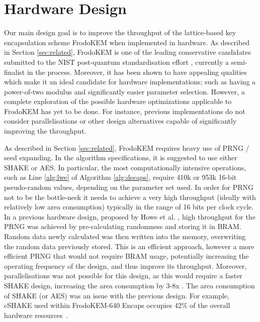 \section{Hardware Design} \label{sec:design}

Our main design goal is to improve the throughput of the lattice-based key encapsulation scheme FrodoKEM \cite{frodokem} when implemented in hardware. As described in Section \ref{sec:related}, FrodoKEM is one of the leading conservative candidates submitted to the NIST post-quantum standardisation effort \cite{nistpq}, currently a semi-finalist in the process. Moreover, it has been shown to have appealing qualities which make it an ideal candidate for hardware implementations; such as having a power-of-two modulus and significantly easier parameter selection. However, a complete exploration of the possible hardware optimizations applicable to FrodoKEM has yet to be done. For instance, previous implementations do not consider parallelisations or other design alternatives capable of significantly improving the throughput.

As described in Section \ref{sec:related}, FrodoKEM requires heavy use of PRNG / seed expanding. In the algorithm specifications, it is suggested to use either SHAKE or AES. In particular, the most computationally intensive operations, such as Line \ref{alg:lwe} of Algorithm \ref{alg:decaps}, require 410k or 953k 16-bit pseudo-random values, depending on the parameter set used. In order for PRNG not to be the bottle-neck it needs to achieve a very high throughput (ideally with relatively low area consumption) typically in the range of 16 bits per clock cycle. In a previous hardware design, proposed by Howe et al. \cite{howe2018standard}, high throughput for the PRNG was achieved by pre-calculating randomness and storing it in BRAM. Random data newly calculated was then written into the memory, overwriting the random data previously stored. This is an efficient approach, however a more efficient PRNG that would not require BRAM usage, potentially increasing the operating frequency of the design, and thus improve its throughput. Moreover, parallelisations was not possible for this design, as this would require a faster SHAKE design, increasing the area consumption by 3-8x \cite{bertoni2012keccak}. The area consumption of SHAKE (or AES) was an issue with the previous design. For example, cSHAKE used within FrodoKEM-640 Encaps occupies 42\% of the overall hardware resources~\cite{howe2018standard}. 

